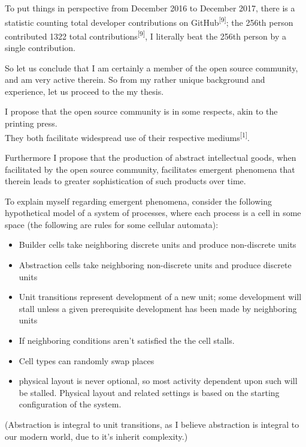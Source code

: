 To put things in perspective from December 2016 to December 2017, there is a statistic counting total developer contributions on GitHub\textsuperscript{[9]}; the 256th person contributed 1322
total contributions\textsuperscript{[9]}, I literally beat the 256th person by a single contribution.

So let us conclude that I am certainly a member of the open source community, and am very active therein. So from my rather unique background and experience, let us proceed to the my thesis.

I propose that the open source community is in some respects, akin to the printing press. \\They both facilitate widespread use of their respective mediums\textsuperscript{[1]}.

Furthermore I propose that the production of abstract intellectual goods, when facilitated by the open source community, facilitates emergent phenomena that therein leads to greater sophistication of such products over time.

To explain myself regarding emergent phenomena, consider the following hypothetical model of a system of processes, where each process is a cell in some space (the following are rules for some cellular automata):

\begin{itemize}
\item Builder cells take neighboring discrete units and produce non-discrete units
\item Abstraction cells take neighboring non-discrete units and produce discrete units
\item Unit transitions represent development of a new unit; some development will
stall unless a given prerequisite development has been made by neighboring units
\item If neighboring conditions aren’t satisfied the the cell stalls.
\item Cell types can randomly swap places
\item physical layout is never optional, so most activity dependent upon such will
be stalled. Physical layout and related settings is based on the starting
configuration of the system.
\end{itemize}


(Abstraction is integral to unit transitions, as I believe abstraction is integral to our modern world, due to it’s inherit complexity.)


